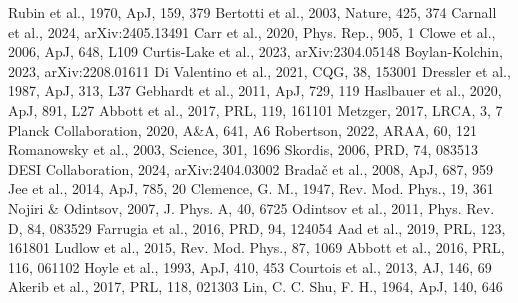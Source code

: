 \documentclass[a4paper,12pt]{article}
\begin{document}
\begin{thebibliography}{}
 Rubin et al., 1970, ApJ, 159, 379
 Bertotti et al., 2003, Nature, 425, 374
 Carnall et al., 2024, arXiv:2405.13491
 Carr et al., 2020, Phys. Rep., 905, 1
 Clowe et al., 2006, ApJ, 648, L109
 Curtis-Lake et al., 2023, arXiv:2304.05148
 Boylan-Kolchin, 2023, arXiv:2208.01611
 Di Valentino et al., 2021, CQG, 38, 153001
 Dressler et al., 1987, ApJ, 313, L37
 Gebhardt et al., 2011, ApJ, 729, 119
 Haslbauer et al., 2020, ApJ, 891, L27
 Abbott et al., 2017, PRL, 119, 161101
 Metzger, 2017, LRCA, 3, 7
 Planck Collaboration, 2020, A\&A, 641, A6
 Robertson, 2022, ARAA, 60, 121
 Romanowsky et al., 2003, Science, 301, 1696
 Skordis, 2006, PRD, 74, 083513
 DESI Collaboration, 2024, arXiv:2404.03002
 Bradač et al., 2008, ApJ, 687, 959
 Jee et al., 2014, ApJ, 785, 20
 Clemence, G. M., 1947, Rev. Mod. Phys., 19, 361
 Nojiri \& Odintsov, 2007, J. Phys. A, 40, 6725
 Odintsov et al., 2011, Phys. Rev. D, 84, 083529
 Farrugia et al., 2016, PRD, 94, 124054
 Aad et al., 2019, PRL, 123, 161801
 Ludlow et al., 2015, Rev. Mod. Phys., 87, 1069
 Abbott et al., 2016, PRL, 116, 061102
 Hoyle et al., 1993, ApJ, 410, 453
 Courtois et al., 2013, AJ, 146, 69
 Akerib et al., 2017, PRL, 118, 021303
 Lin, C. C. Shu, F. H., 1964, ApJ, 140, 646
\end{thebibliography}
\appendix
\end{document}
